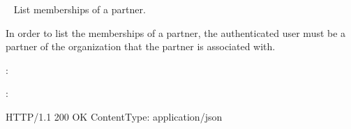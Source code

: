 \documentclass[letterpaper,10pt,english]{sphinxmanual}
\begin{document}
\begin{fulllineitems}
\label{\detokenize{resources/partner:get--partners-(partner_id)-memberships}}~
List memberships of a partner.

In order to list the memberships of a partner, the authenticated user
must be a partner of the organization that the partner is associated
with.

:

\begin{sphinxVerbatim}[commandchars=\\\{\}]
  
 
 
\end{sphinxVerbatim}

:

\begin{sphinxVerbatim}[commandchars=\\\{\}]
HTTP/1.1 200 OK
Content\PYGZhy{}Type: application/json


\end{sphinxVerbatim}
\end{fulllineitems}
\end{document}
